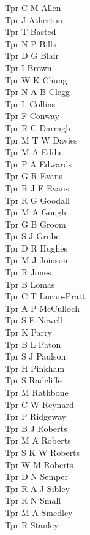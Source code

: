 \begin{multicols}{2}
  Tpr C M Allen \\
  Tpr J Atherton \\
  Tpr T Basted \\
  Tpr N P Bills \\
  Tpr D G Blair \\
  Tpr I Brown \\
  Tpr W K Chung \\
  Tpr N A B Clegg \\
  Tpr L Collins \\
  Tpr F Conway \\
  Tpr R C Darragh \\
  Tpr M T W Davies \\
  Tpr M A Eddie \\
  Tpr P A Edwards \\
  Tpr G R Evans \\
  Tpr R J E Evans \\
  Tpr R G Goodall \\
  Tpr M A Gough \\
  Tpr G B Groom \\
  Tpr S J Grube \\
  Tpr D R Hughes \\
  Tpr M J Joinson \\
  Tpr R Jones \\
  Tpr B Lomas \\
  Tpr C T Lucan-Pratt \\
  Tpr A P McCulloch \\
  Tpr S E Newell \\
  Tpr K Parry \\
  Tpr B L Paton \\
  Tpr S J Paulson \\
  Tpr H Pinkham \\
  Tpr S Radcliffe \\
  Tpr M Rathbone \\
  Tpr C W Reynard \\
  Tpr P Ridgeway \\
  Tpr B J Roberts \\
  Tpr M A Roberts \\
  Tpr S K W Roberts \\
  Tpr W M Roberts \\
  Tpr D N Semper \\
  Tpr R A J Sibley \\
  Tpr R N Small \\
  Tpr M A Smedley \\
  Tpr R Stanley \\

\end{multicols}

